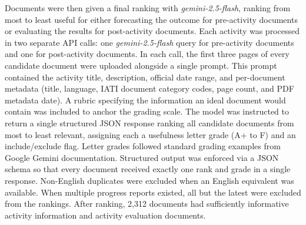 \documentclass[12pt,a4paper]{article}
\begin{document}
Documents were then given a final ranking with \emph{gemini-2.5-flash}, ranking from most to least useful for either forecasting the outcome for pre-activity documents or evaluating the results for post-activity documents. Each activity was processed in two separate API calls: one \emph{gemini-2.5-flash} query for pre-activity documents and one for post-activity documents. In each call, the first three pages of every candidate document were uploaded alongside a single prompt. This prompt contained the activity title, description, official date range, and per-document metadata (title, language, IATI document category codes, page count, and PDF metadata date). A rubric specifying the information an ideal document would contain was included to anchor the grading scale. The model was instructed to return a single structured JSON response ranking all candidate documents from most to least relevant, assigning each a usefulness letter grade (A+ to F) and an include/exclude flag. Letter grades followed standard grading examples from Google Gemini documentation. Structured output was enforced via a JSON schema so that every document received exactly one rank and grade in a single response. Non-English duplicates were excluded when an English equivalent was available. When multiple progress reports existed, all but the latest were excluded from the rankings. After ranking, 2,312 documents had sufficiently informative activity information and activity evaluation documents.
\end{document}
